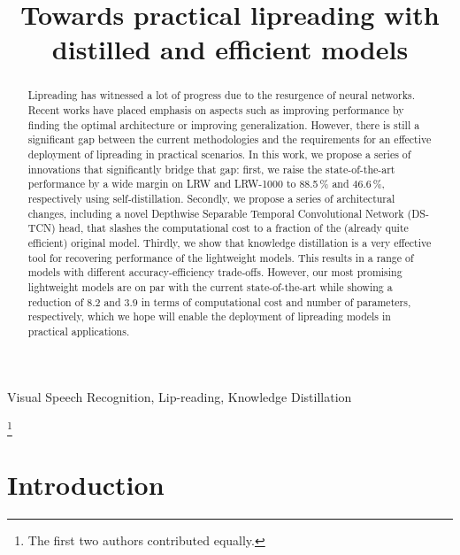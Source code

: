 \documentclass{article}
\title{Towards practical lipreading with distilled and efficient models}
\begin{document}
\maketitle

\begin{abstract}
Lipreading has witnessed a lot of progress due to the resurgence of neural networks. Recent works have placed emphasis on aspects such as improving performance by finding the optimal architecture or improving generalization. However, there is still a significant gap between the current methodologies and the requirements for an effective deployment of lipreading in practical scenarios. In this work, we propose a series of innovations that significantly bridge that gap: first, we raise the state-of-the-art performance by a wide margin on LRW and LRW-1000 to 88.5\,\% and 46.6\,\%, respectively using self-distillation. Secondly, we propose a series of architectural changes, including a novel Depthwise  Separable Temporal Convolutional Network (DS-TCN) head, that slashes the computational cost to a fraction of the (already quite efficient) original model. Thirdly, we show that knowledge distillation is a very effective tool for recovering performance of the lightweight models. This results in a range of models with different accuracy-efficiency trade-offs. However, our most promising lightweight models are on par with the current state-of-the-art while showing a reduction of 8.2 and 3.9 in terms of computational cost and number of parameters, respectively, which we hope will enable the deployment of lipreading models in practical applications.
\end{abstract}
\begin{keywords}
Visual Speech Recognition, Lip-reading, Knowledge Distillation
\end{keywords}


\let\thefootnote\relax\footnote{ The first two authors contributed equally.}


\section{Introduction}
\label{sec:intro}
\end{document}

